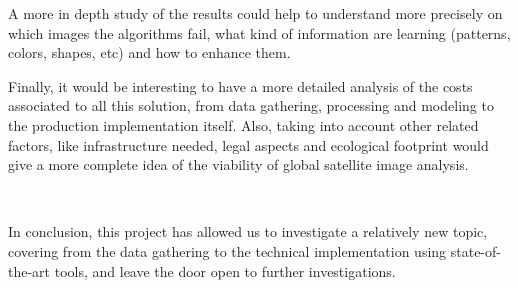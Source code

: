 A more in depth study of the results could help to understand more precisely on which images the algorithms fail, what kind of information are learning (patterns, colors, shapes, etc) and how to enhance them.

Finally, it would be interesting to have a more detailed analysis of the costs associated to all this solution, from data gathering, processing and modeling to the production implementation itself. Also, taking into account other related factors, like infrastructure needed, legal aspects and ecological footprint \parencite{Strubell2019} would give a more complete idea of the viability of global satellite image analysis.

\

In conclusion, this project has allowed us to investigate a relatively new topic, covering from the data gathering to the technical implementation using state-of-the-art tools, and leave the door open to further investigations.
